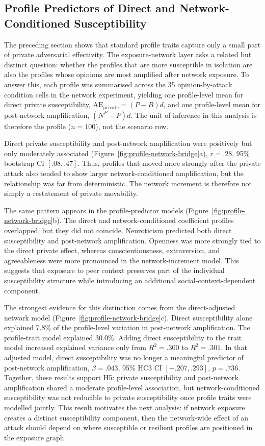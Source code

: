 \documentclass[11pt,a4paper]{article}
\begin{document}
\subsection{Profile Predictors of Direct and Network-Conditioned Susceptibility}
\label{sec:profile-network-bridge}

The preceding section shows that standard profile traits capture only a small part of private
adversarial effectivity. The exposure-network layer asks a related but distinct question: whether
the profiles that are more susceptible in isolation are also the profiles whose opinions are most
amplified after network exposure. To answer this, each profile was summarised across the 35
opinion-by-attack condition cells in the network experiment, yielding one profile-level mean for
direct private susceptibility, \(\mathrm{AE}_{\mathrm{private}}=(P-B)d\), and one profile-level mean
for post-network amplification, \((N^P-P)d\). The unit of inference in this analysis is therefore
the profile (\(n=100\)), not the scenario row.

Direct private susceptibility and post-network amplification were positively but only moderately
associated (Figure~\ref{fig:profile-network-bridge}a), \(r=.28\), 95\% bootstrap CI
\([.08,.47]\). Thus, profiles that moved more strongly after the private attack also tended to show
larger network-conditioned amplification, but the relationship was far from deterministic. The
network increment is therefore not simply a restatement of private movability.

The same pattern appears in the profile-predictor models (Figure~\ref{fig:profile-network-bridge}b).
The direct and network-conditioned coefficient profiles overlapped, but they did not coincide.
Neuroticism predicted both direct susceptibility and post-network amplification. Openness was more
strongly tied to the direct private effect, whereas conscientiousness, extraversion, and
agreeableness were more pronounced in the network-increment model. This suggests that exposure to
peer context preserves part of the individual susceptibility structure while introducing an
additional social-context-dependent component.

The strongest evidence for this distinction comes from the direct-adjusted network model
(Figure~\ref{fig:profile-network-bridge}c). Direct susceptibility alone explained 7.8\% of the
profile-level variation in post-network amplification. The profile-trait model explained 30.0\%.
Adding direct susceptibility to the trait model increased explained variance only from
\(R^2=.300\) to \(R^2=.301\). In that adjusted model, direct susceptibility was no longer a
meaningful predictor of post-network amplification, \(\beta=.043\), 95\% HC3 CI
\([-.207,.293]\), \(p=.736\). Together, these results support H5: private susceptibility and
post-network amplification shared a moderate profile-level association, but network-conditioned
susceptibility was not reducible to private susceptibility once profile traits were modelled
jointly. This result motivates the next analysis: if network exposure creates a distinct
susceptibility component, then the network-wide effect of an attack should depend on where
susceptible or resilient profiles are positioned in the exposure graph.
\end{document}
